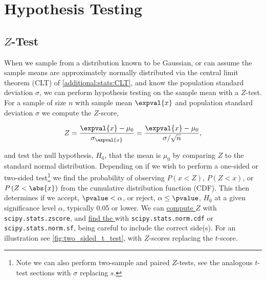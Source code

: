 \chapter{Hypothesis Testing}
\label{chap:hypo}

\section{\texorpdfstring{$Z$}{Z}-Test}
\label{hypo:Z_test}

When we sample from a distribution known to be Gaussian,
or can assume the sample means are approximately normally distributed via the central limit theorem (CLT) of \cref{additional:stats:CLT},
and know the population standard deviation $\sigma$,
we can perform hypothesis testing on the sample mean with a $Z$-test.
For a sample of size $n$ with sample mean $\expval{x}$ and population standard deviation $\sigma$
we compute the $Z$-score,

\begin{equation}\label{eq:hypo:Z}
Z = \frac{\expval{x} - \mu_{0}}{\sigma_{\expval{x}}} = \frac{\expval{x} - \mu_{0}}{\sigma/\sqrt{n}},
\end{equation}

\noindent and test the null hypothesis, $H_{0}$, that the mean is $\mu_{0}$
by comparing $Z$ to the standard normal distribution.
Depending on if we wish to perform a one-sided or two-sided
test\footnote{Note we can also perform two-sample and paired $Z$-tests, see the analogous $t$-test sections with $\sigma$ replacing $s$.} we
find the probability of observing $P\left(x < Z\right)$, $P\left(Z < x\right)$, or $P\left(Z < \abs{x}\right)$
from the cumulative distribution function (CDF).
This \pvalue then determines if we accept, $\pvalue < \alpha$, or reject, $\alpha \leq \pvalue$,
$H_{0}$ at a given significance level $\alpha$, typically \num{0.05} or lower.
We can
\href{https://docs.scipy.org/doc/scipy/reference/generated/scipy.stats.zscore.html}{compute $Z$} with
\texttt{scipy.stats.zscore},
and \href{https://docs.scipy.org/doc/scipy/reference/generated/scipy.stats.norm.html}{find the \pvalue} with
\texttt{scipy.stats.norm.cdf} or \texttt{scipy.stats.norm.sf},
being careful to include the correct side(s).
For an illustration see \cref{fig:two_sided_t_test}, with $Z$-scores replacing the $t$-score.

